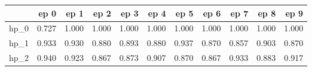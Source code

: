 \begin{tabular}{lrrrrrrrrrr}
\toprule
{} &   ep 0 &   ep 1 &   ep 2 &   ep 3 &   ep 4 &   ep 5 &   ep 6 &   ep 7 &   ep 8 &   ep 9 \\
\midrule
hp\_0 &  0.727 &  1.000 &  1.000 &  1.000 &  1.000 &  1.000 &  1.000 &  1.000 &  1.000 &  1.000 \\
hp\_1 &  0.933 &  0.930 &  0.880 &  0.893 &  0.880 &  0.937 &  0.870 &  0.857 &  0.903 &  0.870 \\
hp\_2 &  0.940 &  0.923 &  0.867 &  0.873 &  0.907 &  0.870 &  0.867 &  0.933 &  0.883 &  0.917 \\
\bottomrule
\end{tabular}
